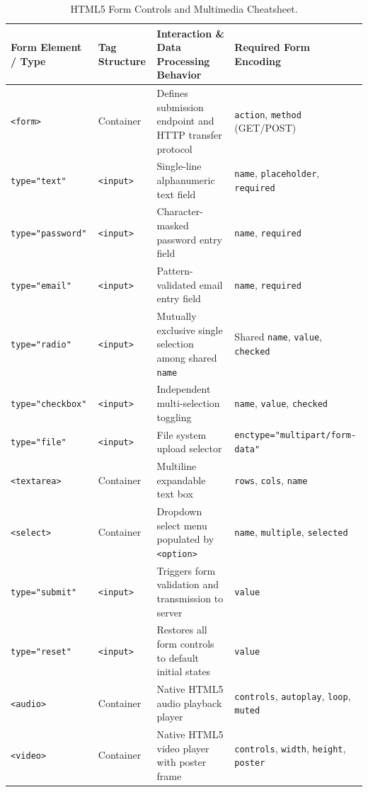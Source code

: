 \begin{table}[htbp]
\centering
\small
\renewcommand{\arraystretch}{1.2}
\begin{tabularx}{\linewidth}{ll>{\raggedright\arraybackslash}Xl}
\toprule
\textbf{Form Element / Type} & \textbf{Tag Structure} & \textbf{Interaction \& Data Processing Behavior} & \textbf{Required Form Encoding} \\
\midrule
\texttt{<form>} & Container & Defines submission endpoint and HTTP transfer protocol & \texttt{action}, \texttt{method} (GET/POST) \\
\texttt{type="text"} & \texttt{<input>} & Single-line alphanumeric text field & \texttt{name}, \texttt{placeholder}, \texttt{required} \\
\texttt{type="password"} & \texttt{<input>} & Character-masked password entry field & \texttt{name}, \texttt{required} \\
\texttt{type="email"} & \texttt{<input>} & Pattern-validated email entry field & \texttt{name}, \texttt{required} \\
\texttt{type="radio"} & \texttt{<input>} & Mutually exclusive single selection among shared \texttt{name} & Shared \texttt{name}, \texttt{value}, \texttt{checked} \\
\texttt{type="checkbox"} & \texttt{<input>} & Independent multi-selection toggling & \texttt{name}, \texttt{value}, \texttt{checked} \\
\texttt{type="file"} & \texttt{<input>} & File system upload selector & \texttt{enctype="multipart/form-data"} \\
\texttt{<textarea>} & Container & Multiline expandable text box & \texttt{rows}, \texttt{cols}, \texttt{name} \\
\texttt{<select>} & Container & Dropdown select menu populated by \texttt{<option>} & \texttt{name}, \texttt{multiple}, \texttt{selected} \\
\texttt{type="submit"} & \texttt{<input>} & Triggers form validation and transmission to server & \texttt{value} \\
\texttt{type="reset"} & \texttt{<input>} & Restores all form controls to default initial states & \texttt{value} \\
\midrule
\texttt{<audio>} & Container & Native HTML5 audio playback player & \texttt{controls}, \texttt{autoplay}, \texttt{loop}, \texttt{muted} \\
\texttt{<video>} & Container & Native HTML5 video player with poster frame & \texttt{controls}, \texttt{width}, \texttt{height}, \texttt{poster} \\
\bottomrule
\end{tabularx}
\caption{HTML5 Form Controls and Multimedia Cheatsheet.}
\label{tab:master-forms-media}
\end{table}

